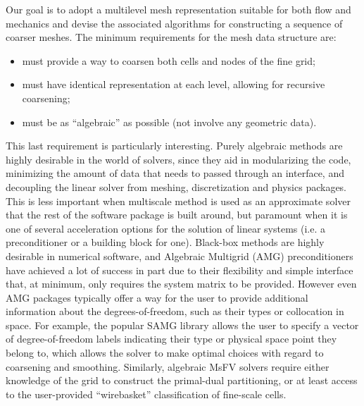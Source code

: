 Our goal is to adopt a multilevel mesh representation suitable for both flow and mechanics and devise the associated algorithms for constructing a sequence of coarser meshes.   The minimum requirements for the mesh data structure are:
\begin{itemize}
    \item must provide a way to coarsen both cells and nodes of the fine grid;
    \item must have identical representation at each level, allowing for recursive coarsening;
    \item must be as ``algebraic'' as possible (not involve any geometric data).
\end{itemize}
This last requirement is particularly interesting.   Purely algebraic methods are highly desirable in the world of solvers, since they aid in modularizing the code, minimizing the amount of data that needs to passed through an interface, and decoupling the linear solver from meshing, discretization and physics packages.   This is less important when multiscale method is used as an approximate solver that the rest of the software package is built around, but paramount when it is one of several acceleration options for the solution of linear systems (i.e. a preconditioner or a building block for one).   Black-box methods are highly desirable in numerical software, and Algebraic Multigrid (AMG) preconditioners have achieved a lot of success in part due to their flexibility and simple interface that, at minimum, only requires the system matrix to be provided.   However even AMG packages typically offer a way for the user to provide additional information about the degrees-of-freedom, such as their types or collocation in space. For example, the popular SAMG library allows the user to specify a vector of degree-of-freedom labels indicating their type or physical space point they belong to, which allows the solver to make optimal choices with regard to coarsening and smoothing.   Similarly, algebraic MsFV solvers require either knowledge of the grid to construct the primal-dual partitioning, or at least access to the user-provided ``wirebasket'' classification of fine-scale cells.

